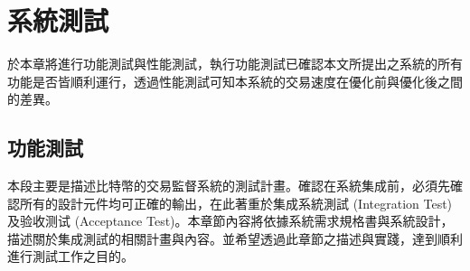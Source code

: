 \chapter{系統測試}
於本章將進行功能測試與性能測試，執行功能測試已確認本文所提出之系統的所有功能是否皆順利運行，透過性能測試可知本系統的交易速度在優化前與優化後之間的差異。
	\section{功能測試}
	 	本段主要是描述比特幣的交易監督系統的測試計畫。確認在系統集成前，必須先確認所有的設計元件均可正確的輸出，在此著重於集成系統測試 (Integration Test) 及验收测试 (Acceptance Test)。本章節內容將依據系統需求規格書與系統設計，描述關於集成測試的相關計畫與內容。並希望透過此章節之描述與實踐，達到順利進行測試工作之目的。
